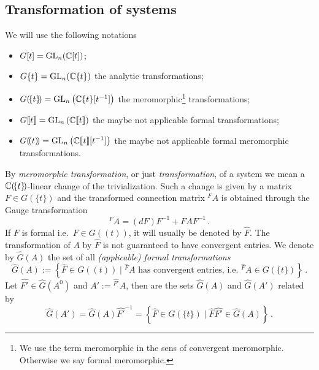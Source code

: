 \subsection{Transformation of systems}
\begin{notations}
  We will use the following notations
  \begin{itemize}
    \item $G[t]=\operatorname{GL}_n(\mathbb{C}[t])$;
    \item $G\{t\}=\operatorname{GL}_n(\mathbb{C}\{t\})$ the analytic transformations;
    \item $G(\!\{t\}\!)=\operatorname{GL}_n\left(\mathbb{C}\{t\}[t^{-1}]\right)$ the
      meromorphic\footnote{We use the term meromorphic in the sens of
      convergent meromorphic. Otherwise we say formal meromorphic.}
      transformations;
    \item $G\llbracket t\rrbracket=\operatorname{GL}_n\left(\mathbb{C}\llbracket t\rrbracket\right)$
      the maybe not applicable formal transformations;
    \item $G(\!(t)\!)=\operatorname{GL}_n\left(\mathbb{C}\llbracket t\rrbracket[t^{-1}]\right)$
      the maybe not applicable formal meromorphic transformations.
  \end{itemize}
\end{notations}
By \emph{meromorphic transformation}, or just \emph{transformation}, of a
system we mean a $\mathbb{C}(\!\{t\}\!)$-linear change of the trivialization.
Such a change is given by a matrix $F\in G(\!\{t\}\!)$ and the transformed
connection matrix ${}^F\!A$ is obtained through the Gauge transformation
\[
  {}^F\!A=(dF)F^{-1} + FAF^{-1} \,.
\]
If $F$ is formal i.e.\ $F\in G(\!(t)\!)$, it will usually be denoted by
$\hat F$.
The transformation of $A$ by $\hat F$ is not guaranteed to have convergent
entries.
We denote by $\hat G(A)$ the set of all \emph{(applicable) formal
transformations}
\[
  \hat G(A):=\left\{\hat F\in G(\!(t)\!)
    \mid {}^{\hat F}\!A
    \text{ has convergent entries, i.e.\ ${}^{\hat F}\!A\in G(\!\{t\}\!)$}
  \right\}\,.
\]
Let $\hat{F'}\in\hat G(A^0)$ and $A':={}^{\hat{F'}}\!A$, then are the sets
$\hat G(A)$ and $\hat G(A')$ related by
\[
  \hat G(A')=\hat G(A)\hat{F'}^{-1}=\left\{
    \hat F\in G(\!\{t\}\!) \mid \hat F\hat{F'}\in\hat G(A)
  \right\} \,.
\]


